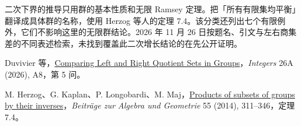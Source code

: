 \documentclass[11pt,a4paper]{article}
\newcommand{\head}[1]{\par\vspace{2pt}{\large\bfseries\color{accent}#1}\par}
\begin{document}
\head{使用了哪些在先结果}
二次下界的推导只用群的基本性质和无限 Ramsey 定理。把「所有有限集均平衡」翻译成具体群的名称，使用 Herzog 等人的定理 7.4。该分类还列出七个有限例外，它们不影响这里的无限群结论。2026 年 11 月 26 日按题名、引文与左右商集差的不同表述检索，未找到覆盖此二次增长结论的在先公开证明。

{\small Duvivier 等，\href{https://math.colgate.edu/~integers/aap8/aap8.pdf\#page=14}{Comparing Left and Right Quotient Sets in Groups}，\emph{Integers} 26A (2026), A8，第 5 问。\par
M. Herzog、G. Kaplan、P. Longobardi、M. Maj，\href{https://doi.org/10.1007/s13366-013-0141-y}{Products of subsets of groups by their inverses}，\emph{Beiträge zur Algebra und Geometrie} 55 (2014), 311–346，定理 7.4。}
\end{document}
